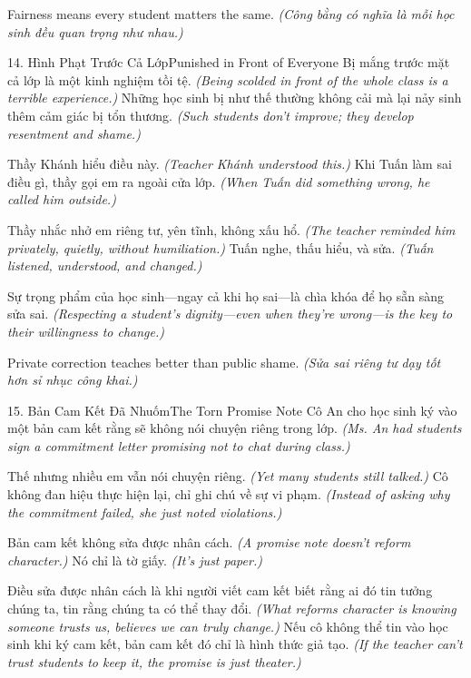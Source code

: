 \begin{ghinhoanh}
Fairness means every student matters the same.
\textit{(Công bằng có nghĩa là mỗi học sinh đều quan trọng như nhau.)}
\end{ghinhoanh}

\begin{truyen}{14. Hình Phạt Trước Cả Lớp}{Punished in Front of Everyone}
Bị mắng trước mặt cả lớp là một kinh nghiệm tồi tệ.
\textit{(Being scolded in front of the whole class is a terrible experience.)}
Những học sinh bị như thế thường không cải mà lại nảy sinh thêm cảm giác bị tổn thương.
\textit{(Such students don't improve; they develop resentment and shame.)}

Thầy Khánh hiểu điều này.
\textit{(Teacher Khánh understood this.)}
Khi Tuấn làm sai điều gì, thầy gọi em ra ngoài cửa lớp.
\textit{(When Tuấn did something wrong, he called him outside.)}

Thầy nhắc nhở em riêng tư, yên tĩnh, không xấu hổ.
\textit{(The teacher reminded him privately, quietly, without humiliation.)}
Tuấn nghe, thấu hiểu, và sửa.
\textit{(Tuấn listened, understood, and changed.)}

Sự trọng phẩm của học sinh—ngay cả khi họ sai—là chìa khóa để họ sẵn sàng sửa sai.
\textit{(Respecting a student's dignity—even when they're wrong—is the key to their willingness to change.)}
\end{truyen}

\begin{baihoc}
Private correction teaches better than public shame.
\textit{(Sửa sai riêng tư dạy tốt hơn sỉ nhục công khai.)}
\end{baihoc}

\begin{truyen}{15. Bản Cam Kết Đã Nhuốm}{The Torn Promise Note}
Cô An cho học sinh ký vào một bản cam kết rằng sẽ không nói chuyện riêng trong lớp.
\textit{(Ms. An had students sign a commitment letter promising not to chat during class.)}

Thế nhưng nhiều em vẫn nói chuyện riêng.
\textit{(Yet many students still talked.)}
Cô không đan hiệu thực hiện lại, chỉ ghi chú về sự vi phạm.
\textit{(Instead of asking why the commitment failed, she just noted violations.)}

Bản cam kết không sửa được nhân cách.
\textit{(A promise note doesn't reform character.)}
Nó chỉ là tờ giấy.
\textit{(It's just paper.)}

Điều sửa được nhân cách là khi người viết cam kết biết rằng ai đó tin tưởng chúng ta, tin rằng chúng ta có thể thay đổi.
\textit{(What reforms character is knowing someone trusts us, believes we can truly change.)}
Nếu cô không thể tin vào học sinh khi ký cam kết, bản cam kết đó chỉ là hình thức giả tạo.
\textit{(If the teacher can't trust students to keep it, the promise is just theater.)}
\end{truyen}

